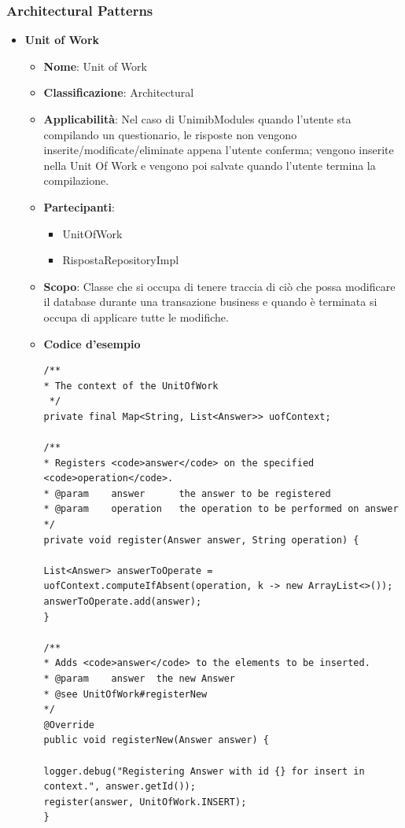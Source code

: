 \documentclass[12pt]{article}
\begin{document}
\subsubsection{Architectural Patterns}
	\begin{itemize}
		\item \textbf{Unit of Work}
    	\begin{itemize}
            \item \textbf{Nome}: Unit of Work
            \item \textbf{Classificazione}: Architectural
            \item \textbf{Applicabilità}: Nel caso di UnimibModules quando l'utente sta compilando un questionario, le risposte non vengono inserite/modificate/eliminate appena l'utente conferma; vengono inserite nella Unit Of Work e vengono poi salvate quando l'utente termina la compilazione.
            \item \textbf{Partecipanti}:
                \begin{itemize}
                    \item {UnitOfWork}
                    \item {RispostaRepositoryImpl}
                    
                \end{itemize}
            \item \textbf{Scopo}: Classe che si occupa di tenere traccia di ciò che possa modificare il database durante una transazione business e quando è terminata si occupa di applicare tutte le modifiche.
             \item \textbf{Codice d'esempio}
            \begin{lstlisting}
/**
* The context of the UnitOfWork
 */
private final Map<String, List<Answer>> uofContext;

/**
* Registers <code>answer</code> on the specified <code>operation</code>.
* @param	answer		the answer to be registered
* @param	operation	the operation to be performed on answer
*/
private void register(Answer answer, String operation) {

List<Answer> answerToOperate = uofContext.computeIfAbsent(operation, k -> new ArrayList<>());
answerToOperate.add(answer);
}

/**
* Adds <code>answer</code> to the elements to be inserted.
* @param	answer	the new Answer
* @see UnitOfWork#registerNew
*/
@Override
public void registerNew(Answer answer) {

logger.debug("Registering Answer with id {} for insert in context.", answer.getId());
register(answer, UnitOfWork.INSERT);
}


\end{lstlisting}
\end{itemize}
\end{itemize}
\end{document}
